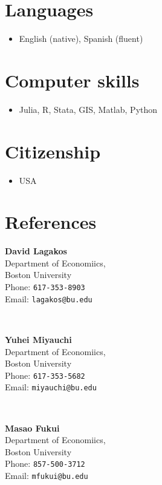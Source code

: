 \documentclass[11pt]{article}
\newenvironment{customitemize}
{ \begin{itemize}[
	leftmargin=\parindent,
	itemindent=-0.5\parindent,
	topsep = 0pt, 
	itemsep = -1pt, 
	label={}] }
{\end{itemize} }
\begin{document}
\section*{Languages}
\begin{customitemize}
\item English (native), Spanish (fluent)
\end{customitemize}

\section*{Computer skills}
\begin{customitemize}
\item Julia, R, Stata, GIS, Matlab, Python
\end{customitemize}

\section*{Citizenship}
\begin{customitemize}
\item USA
\end{customitemize}

\section*{References}
\begin{minipage}{0.3\textwidth}
\textbf{David Lagakos} \\
Department of Economiics,  \\
Boston University \\
Phone: \texttt{617-353-8903} \\
Email: \texttt{lagakos@bu.edu}
\end{minipage}
~
\begin{minipage}{0.3\textwidth}
\textbf{Yuhei Miyauchi} \\
Department of Economiics,  \\
Boston University \\
Phone: \texttt{617-353-5682} \\
Email: \texttt{miyauchi@bu.edu}
\end{minipage}
~
\begin{minipage}{0.3\textwidth}
\textbf{Masao Fukui} \\
Department of Economiics, \\
Boston University \\
Phone: \texttt{857-500-3712} \\
Email: \texttt{mfukui@bu.edu} 
\end{minipage}
\end{document}
